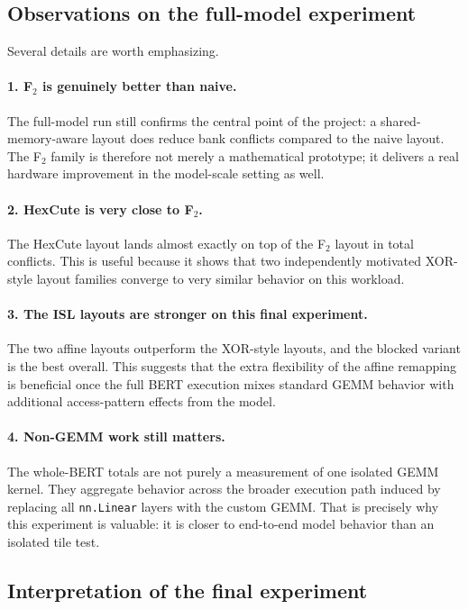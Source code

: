 \documentclass[11pt,a4paper]{article}
\begin{document}
\subsection{Observations on the full-model experiment}

Several details are worth emphasizing.

\paragraph{1. F$_2$ is genuinely better than naive.}
The full-model run still confirms the central point of the project: a
shared-memory-aware layout does reduce bank conflicts compared to the naive
layout.  The F$_2$ family is therefore not merely a mathematical prototype; it
delivers a real hardware improvement in the model-scale setting as well.

\paragraph{2. HexCute is very close to F$_2$.}
The HexCute layout lands almost exactly on top of the F$_2$ layout in total
conflicts.  This is useful because it shows that two independently motivated
XOR-style layout families converge to very similar behavior on this workload.

\paragraph{3. The ISL layouts are stronger on this final experiment.}
The two affine layouts outperform the XOR-style layouts, and the blocked
variant is the best overall.  This suggests that the extra flexibility of the
affine remapping is beneficial once the full BERT execution mixes standard GEMM
behavior with additional access-pattern effects from the model.

\paragraph{4. Non-GEMM work still matters.}
The whole-BERT totals are not purely a measurement of one isolated GEMM kernel.
They aggregate behavior across the broader execution path induced by replacing
all \texttt{nn.Linear} layers with the custom GEMM.  That is precisely why
this experiment is valuable: it is closer to end-to-end model behavior than an
isolated tile test.

\subsection{Interpretation of the final experiment}
\end{document}
